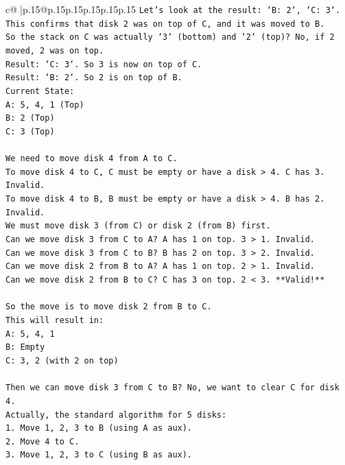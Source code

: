 \documentclass{article}
\begin{document}
{\begin{supertabular}{c@{$\;$}|p{.15\linewidth}@{}p{.15\linewidth}p{.15\linewidth}p{.15\linewidth}p{.15\linewidth}p{.15\linewidth}}
{{{\texttt{Let's look at the result: `B: 2`, `C: 3`.} \\
\texttt{This confirms that disk 2 was on top of C, and it was moved to B.} \\
\texttt{So the stack on C was actually `3` (bottom) and `2` (top)? No, if 2 moved, 2 was on top.} \\
\texttt{Result: `C: 3`. So 3 is now on top of C.} \\
\texttt{Result: `B: 2`. So 2 is on top of B.} \\
\texttt{Current State:} \\
\texttt{A: 5, 4, 1 (Top)} \\
\texttt{B: 2 (Top)} \\
\texttt{C: 3 (Top)} \\
\\ 
\texttt{We need to move disk 4 from A to C.} \\
\texttt{To move disk 4 to C, C must be empty or have a disk > 4. C has 3. Invalid.} \\
\texttt{To move disk 4 to B, B must be empty or have a disk > 4. B has 2. Invalid.} \\
\texttt{We must move disk 3 (from C) or disk 2 (from B) first.} \\
\texttt{Can we move disk 3 from C to A? A has 1 on top. 3 > 1. Invalid.} \\
\texttt{Can we move disk 3 from C to B? B has 2 on top. 3 > 2. Invalid.} \\
\texttt{Can we move disk 2 from B to A? A has 1 on top. 2 > 1. Invalid.} \\
\texttt{Can we move disk 2 from B to C? C has 3 on top. 2 < 3. **Valid!**} \\
\\ 
\texttt{So the move is to move disk 2 from B to C.} \\
\texttt{This will result in:} \\
\texttt{A: 5, 4, 1} \\
\texttt{B: Empty} \\
\texttt{C: 3, 2 (with 2 on top)} \\
\\ 
\texttt{Then we can move disk 3 from C to B? No, we want to clear C for disk 4.} \\
\texttt{Actually, the standard algorithm for 5 disks:} \\
\texttt{1. Move 1, 2, 3 to B (using A as aux).} \\
\texttt{2. Move 4 to C.} \\
\texttt{3. Move 1, 2, 3 to C (using B as aux).} \\
}}}
\end{supertabular}}
\end{document}
